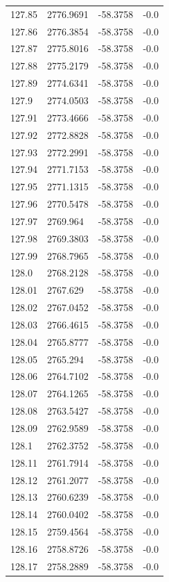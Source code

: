 \begin{table}[H]
\begin{tabular}{llll}
127.85 & 2776.9691 & -58.3758 & -0.0 \\
127.86 & 2776.3854 & -58.3758 & -0.0 \\
127.87 & 2775.8016 & -58.3758 & -0.0 \\
127.88 & 2775.2179 & -58.3758 & -0.0 \\
127.89 & 2774.6341 & -58.3758 & -0.0 \\
127.9 & 2774.0503 & -58.3758 & -0.0 \\
127.91 & 2773.4666 & -58.3758 & -0.0 \\
127.92 & 2772.8828 & -58.3758 & -0.0 \\
127.93 & 2772.2991 & -58.3758 & -0.0 \\
127.94 & 2771.7153 & -58.3758 & -0.0 \\
127.95 & 2771.1315 & -58.3758 & -0.0 \\
127.96 & 2770.5478 & -58.3758 & -0.0 \\
127.97 & 2769.964 & -58.3758 & -0.0 \\
127.98 & 2769.3803 & -58.3758 & -0.0 \\
127.99 & 2768.7965 & -58.3758 & -0.0 \\
128.0 & 2768.2128 & -58.3758 & -0.0 \\
128.01 & 2767.629 & -58.3758 & -0.0 \\
128.02 & 2767.0452 & -58.3758 & -0.0 \\
128.03 & 2766.4615 & -58.3758 & -0.0 \\
128.04 & 2765.8777 & -58.3758 & -0.0 \\
128.05 & 2765.294 & -58.3758 & -0.0 \\
128.06 & 2764.7102 & -58.3758 & -0.0 \\
128.07 & 2764.1265 & -58.3758 & -0.0 \\
128.08 & 2763.5427 & -58.3758 & -0.0 \\
128.09 & 2762.9589 & -58.3758 & -0.0 \\
128.1 & 2762.3752 & -58.3758 & -0.0 \\
128.11 & 2761.7914 & -58.3758 & -0.0 \\
128.12 & 2761.2077 & -58.3758 & -0.0 \\
128.13 & 2760.6239 & -58.3758 & -0.0 \\
128.14 & 2760.0402 & -58.3758 & -0.0 \\
128.15 & 2759.4564 & -58.3758 & -0.0 \\
128.16 & 2758.8726 & -58.3758 & -0.0 \\
128.17 & 2758.2889 & -58.3758 & -0.0 \\

\end{tabular}
\end{table}
